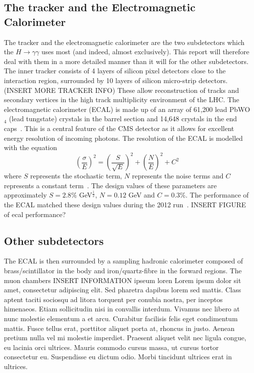 \documentclass[10pt]{article}
\begin{document}
\subsection{The tracker and the Electromagnetic Calorimeter}

The tracker and the electromagnetic calorimeter are the two subdetectors which the $H \rightarrow \gamma \gamma$ uses most (and indeed, almost exclusively). This report will therefore deal with them in a more detailed manner than it will for the other subdetectors.
The inner tracker consists of 4 layers of silicon pixel detectors close to the interaction region, surrounded by 10 layers of silicon micro-strip detectors. (INSERT MORE TRACKER INFO) These allow reconstruction of tracks and secondary vertices in the high track multiplicity environment of the LHC. The electromagnetic calorimeter (ECAL) is made up of an array of 61,200 lead PbWO$_4$ (lead tungstate) crystals in the barrel section and 14,648 crystals in the end caps~\cite{CMSTDR}. This is a central feature of the CMS detector as it allows for excellent energy resolution of incoming photons. The resolution of the ECAL is modelled with the equation \begin{equation} \left( \frac{\sigma}{E}\right) ^2= \left( \frac{S}{\sqrt{E}} \right)^2 + \left( \frac{N}{E} \right)^2 + C^2\end{equation} where $S$ represents the stochastic term, $N$ represents the noise terms and $C$ represents a constant term~\cite{CMSDesign}. The design values of these parameters are approximately $S=2.8\%$ GeV$^\frac{1}{2}$, $ N= 0.12$ GeV and $C=0.3 \%$. The performance of the ECAL matched these design values during the 2012 run~\cite{ECAL2012}. INSERT FIGURE of ecal performance?

\subsection{Other subdetectors}

The ECAL is then surrounded by a sampling hadronic calorimeter composed of brass/scintillator in the body and iron/quartz-fibre in the forward regions. The muon chambers INSERT INFORMATION ipseum loren Lorem ipsum dolor sit amet, consectetur adipiscing elit. Sed pharetra dapibus lorem sed mattis. Class aptent taciti sociosqu ad litora torquent per conubia nostra, per inceptos himenaeos. Etiam sollicitudin nisi in convallis interdum. Vivamus nec libero at nunc molestie elementum a et arcu. Curabitur facilisis felis eget condimentum mattis. Fusce tellus erat, porttitor aliquet porta at, rhoncus in justo. Aenean pretium nulla vel mi molestie imperdiet. Praesent aliquet velit nec ligula congue, eu lacinia orci ultrices. Mauris commodo cursus massa, ut cursus tortor consectetur eu. Suspendisse eu dictum odio. Morbi tincidunt ultrices erat in ultrices. 
\newpage
\end{document}
